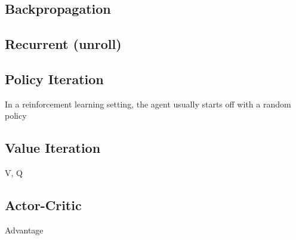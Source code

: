 \subsection{Backpropagation}

\subsection{Recurrent (unroll)}


\subsection{Policy Iteration}
In a reinforcement learning setting, the agent usually starts off with a random
policy 

\subsection{Value Iteration}
V, Q

\subsection{Actor-Critic}


Advantage

